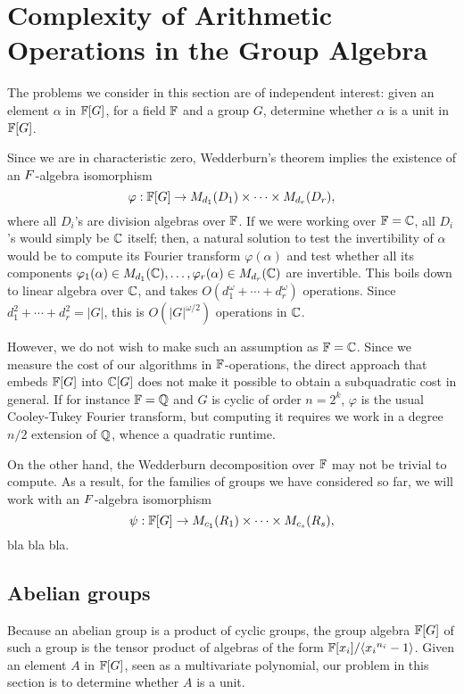 \section{Complexity of Arithmetic Operations in the Group Algebra}

The problems we consider in this section are of independent interest:
given an element $\alpha$ in $\mathbb{F}[G]$, for a field $\mathbb{F}$ and a group $G$,
determine whether $\alpha$ is a unit in $\mathbb{F}[G]$. 

Since we are in characteristic zero, Wedderburn's theorem implies the
existence of an $\\F$-algebra isomorphism
$$\varphi: \mathbb{F}[G] \to M_{d_1}(D_1) \times \dots \times M_{d_r}(D_r),$$
where all $D_i$'s are division algebras over $\mathbb{F}$. If we were working
over $\mathbb{F}=\mathbb{C}$, all $D_i$'s would simply be $\mathbb{C}$ itself; then, a natural
solution to test the invertibility of $\alpha$ would be to compute its
Fourier transform $\varphi(\alpha)$ and test whether all its
components $\varphi_1(\alpha) \in M_{d_1}(\mathbb{C}),\dots,\varphi_r(\alpha)
\in M_{d_r}(\mathbb{C})$ are invertible. This boils down to linear algebra
over $\mathbb{C}$, and takes $O(d_1^\omega + \cdots + d_r^\omega)$ operations.
Since $d_1^2 + \cdots + d_r^2 = |G|$, this is $O(|G|^{\omega/2})$
operations in $\mathbb{C}$.

However, we do not wish to make such an assumption as $\mathbb{F}=\mathbb{C}$. Since we
measure the cost of our algorithms in $\mathbb{F}$-operations, the direct
approach that embeds $\mathbb{F}[G]$ into $\mathbb{C}[G]$ does not make it possible to
obtain a subquadratic cost in general. If for instance $\mathbb{F}=\mathbb{Q}$ and $G$
is cyclic of order $n=2^k$, $\varphi$ is the usual Cooley-Tukey
Fourier transform, but computing it requires we work in a degree $n/2$
extension of $\mathbb{Q}$, whence a quadratic runtime.

On the other hand, the Wedderburn decomposition over $\mathbb{F}$ may not be
trivial to compute. As a result, for the families of groups we have
considered so far, we will work with an 
 $\\F$-algebra isomorphism
$$\psi: \mathbb{F}[G] \to M_{c_1}(R_1) \times \dots \times M_{c_s}(R_s),$$
bla bla bla.



\subsection{Abelian groups}

Because an abelian group is a product of cyclic groups, the group
algebra $\mathbb{F}[G]$ of such a group is the tensor product of algebras of the
form $\mathbb{F}[x_i]/\langle {x_i}^{n_i}-1 \rangle$. Given an element $A$ in
$\mathbb{F}[G]$, seen as a multivariate polynomial, our problem in
this section is to determine whether $A$ is a unit.

